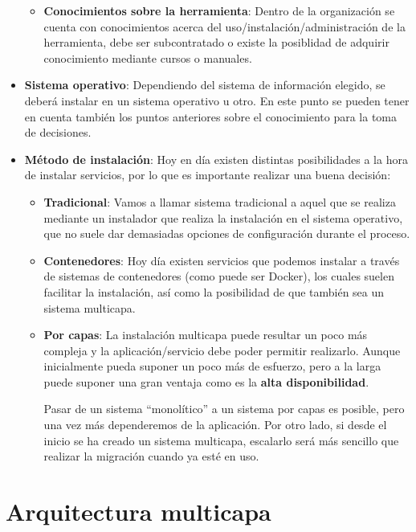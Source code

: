 \begin{itemize}
\begin{itemize}
        \item \textbf{Conocimientos sobre la herramienta}: Dentro de la organización se cuenta con conocimientos acerca del uso/instalación/administración de la herramienta, debe ser subcontratado o existe la posiblidad de adquirir conocimiento mediante cursos o manuales.
    \end{itemize}

    \item \textbf{Sistema operativo}: Dependiendo del sistema de información elegido, se deberá instalar en un sistema operativo u otro. En este punto se pueden tener en cuenta también los puntos anteriores sobre el conocimiento para la toma de decisiones.

    \item \textbf{Método de instalación}: Hoy en día existen distintas posibilidades a la hora de instalar servicios, por lo que es importante realizar una buena decisión:
    \begin{itemize}
        \item \textbf{Tradicional}: Vamos a llamar sistema tradicional a aquel que se realiza mediante un instalador que realiza la instalación en el sistema operativo, que no suele dar demasiadas opciones de configuración durante el proceso.
        \item \textbf{Contenedores}: Hoy día existen servicios que podemos instalar a través de sistemas de contenedores (como puede ser Docker), los cuales suelen facilitar la instalación, así como la posibilidad de que también sea un sistema multicapa.
        \item \textbf{Por capas}: La instalación multicapa puede resultar un poco más compleja y la aplicación/servicio debe poder permitir realizarlo. Aunque inicialmente pueda suponer un poco más de esfuerzo, pero a la larga puede suponer una gran ventaja como es la \textbf{alta disponibilidad}.

        Pasar de un sistema “monolítico” a un sistema por capas es posible, pero una vez más dependeremos de la aplicación. Por otro lado, si desde el inicio se ha creado un sistema multicapa, escalarlo será más sencillo que realizar la migración cuando ya esté en uso.
    \end{itemize}

\end{itemize}


\section{Arquitectura multicapa}

